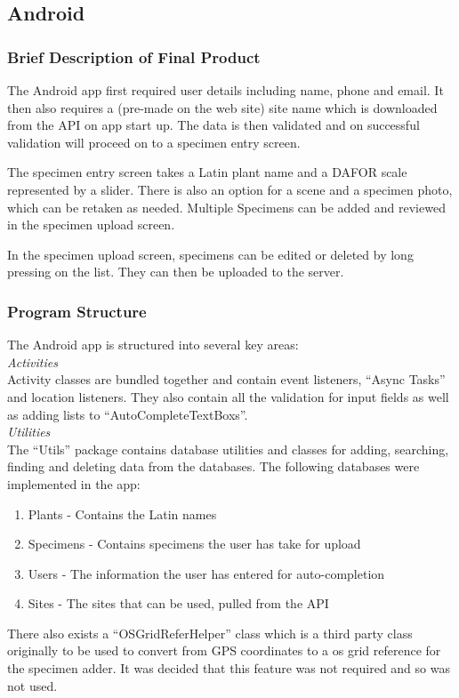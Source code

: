 \subsection{Android}
    \subsubsection{Brief Description of Final Product}
        The Android app first required user details including name, phone and email. It then also requires a (pre-made on the web site) site name which is downloaded from the API on app start up. The data is then validated and on successful validation will proceed on to a specimen entry screen.

        The specimen entry screen takes a Latin plant name and a DAFOR scale represented by a slider. There is also an option for a scene and a specimen photo, which can be retaken as needed. Multiple Specimens can be added and reviewed in the specimen upload screen.

        In the specimen upload screen, specimens can be edited or deleted by long pressing on the list. They can then be uploaded to the server.

    \subsubsection{Program Structure}
        The Android app is structured into several key areas: \\
        
        \emph{Activities}\\
        Activity classes are bundled together and contain event listeners, ``Async Tasks'' and location listeners. They also contain all the validation for input fields as well as adding lists to ``AutoCompleteTextBoxs''. \\

        \emph{Utilities}\\
        The ``Utils'' package contains database utilities and classes for adding, searching, finding and deleting data from the databases. The following databases were implemented in the app:
        \begin{enumerate}
            \item Plants - Contains the Latin names
            \item Specimens - Contains specimens the user has take for upload
            \item Users - The information the user has entered for auto-completion
            \item Sites - The sites that can be used, pulled from the API
        \end{enumerate}
        There also exists a ``OSGridReferHelper'' class which is a third party class originally to be used to convert from GPS coordinates to a os grid reference for the specimen adder. It was decided that this feature was not required and so was not used.\\

